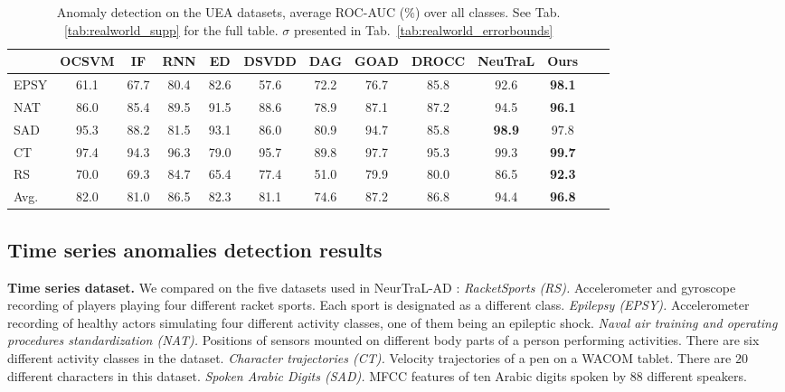 \documentclass{article}
\begin{document}
\begin{table*}
\caption{Anomaly detection on the UEA datasets, average ROC-AUC ($\%$) over all classes. \newline See Tab.\ref{tab:realworld_supp} for the full table. $\sigma$ presented in Tab.~\ref{tab:realworld_errorbounds}}
\centering
\small
\begin{tabular}{lcccccccccccc}
\toprule

	&	OCSVM	&	IF	&		RNN	&	ED	&	DSVDD	& DAG		&	GOAD	&	DROCC	&	NeuTraL	&	Ours	\\ \midrule
EPSY	&	61.1	&	67.7		&	80.4	&	82.6	&	57.6	& 72.2  &	76.7	&	85.8	&	92.6	&	\textbf{98.1}	\\
NAT	&	86.0	&	85.4		&	89.5	&	91.5	&	88.6 & 78.9	& 	87.1	&	87.2	&	94.5	&	\textbf{96.1}	\\
SAD	&	95.3	&	88.2	&	81.5	&	93.1	&	86.0 & 80.9	& 	94.7	&	85.8	&	\textbf{98.9}	&	97.8	\\
CT	&	97.4	&	94.3		&	96.3	&	79.0	&	95.7 & 89.8	& 	97.7	&	95.3	&	99.3	&	\textbf{99.7}	\\
RS	&	70.0	&	69.3		&	84.7	&	65.4	&	77.4 & 51.0	& 	79.9	&	80.0	&	86.5	& \textbf{92.3}		\\ \midrule
Avg.	&	82.0	&	81.0	&	86.5	&	82.3	&	81.1 & 74.6 	&	87.2	&	86.8	&	94.4	&	\textbf{96.8}	\\

\bottomrule
\end{tabular}
\label{tab:realworld}
\end{table*}

\subsection{Time series anomalies detection results}

\label{subsec:time_series}

\textbf{Time series dataset.} We compared on the five datasets used in NeurTraL-AD \cite{qiu2021neural}: \textit{RacketSports (RS).} Accelerometer and gyroscope recording of players playing four different racket sports. Each sport is designated as a different class. \textit{Epilepsy (EPSY).} Accelerometer recording of healthy actors simulating four different activity classes, one of them being an epileptic shock. \textit{Naval air training and operating procedures standardization (NAT).} Positions of sensors mounted on different body parts of a person performing activities. There are six different activity classes in the dataset. \textit{Character trajectories (CT).} Velocity trajectories of a pen on a WACOM tablet. There are $20$ different characters in this dataset.  \textit{Spoken Arabic Digits (SAD).} MFCC features of ten Arabic digits spoken by $88$ different speakers.
\end{document}

